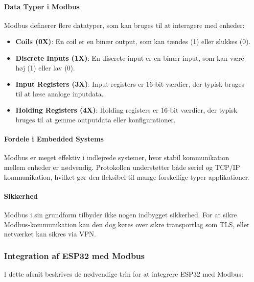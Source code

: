 \documentclass[12pt,a4paper]{book}
\begin{document}
	\paragraph{Data Typer i Modbus}
	Modbus definerer flere datatyper, som kan bruges til at interagere med enheder:
	\begin{itemize}
		\item \textbf{Coils (0X)}: En coil er en binær output, som kan tændes (1) eller slukkes (0).
		\item \textbf{Discrete Inputs (1X)}: En discrete input er en binær input, som kan være høj (1) eller lav (0).
		\item \textbf{Input Registers (3X)}: Input registers er 16-bit værdier, der typisk bruges til at læse analoge inputdata.
		\item \textbf{Holding Registers (4X)}: Holding registers er 16-bit værdier, der typisk bruges til at gemme outputdata eller konfigurationer.
	\end{itemize}
	
	\paragraph{Fordele i Embedded Systems}
	Modbus er meget effektiv i indlejrede systemer, hvor stabil kommunikation mellem enheder er nødvendig. Protokollen understøtter både seriel og TCP/IP kommunikation, hvilket gør den fleksibel til mange forskellige typer applikationer.
	
	\paragraph{Sikkerhed}
	Modbus i sin grundform tilbyder ikke nogen indbygget sikkerhed. For at sikre Modbus-kommunikation kan den dog køres over sikre transportlag som TLS, eller netværket kan sikres via VPN.
	
	\subsubsection*{Integration af ESP32 med Modbus}
	I dette afsnit beskrives de nødvendige trin for at integrere ESP32 med Modbus:
	
\end{document}
